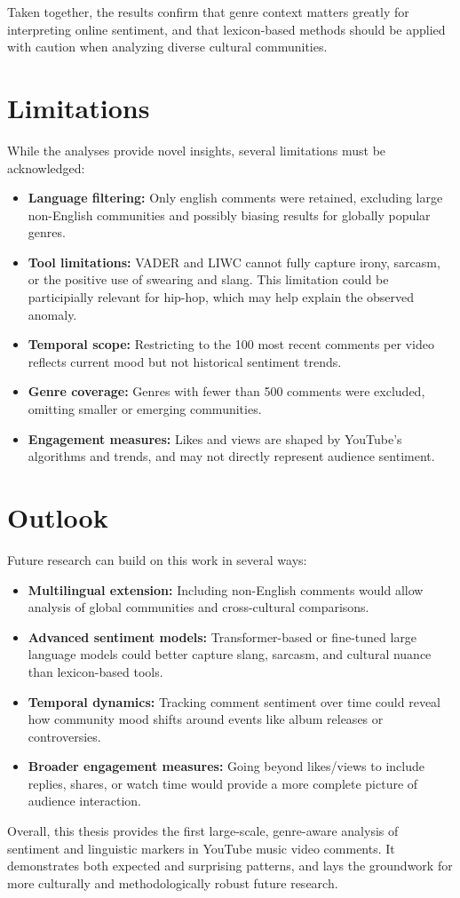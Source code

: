 Taken together, the results confirm that genre context matters greatly for interpreting online sentiment, and that lexicon-based methods should be applied with caution when analyzing diverse cultural communities.  

\section{Limitations}

While the analyses provide novel insights, several limitations must be acknowledged:

\begin{itemize}
    \item \textbf{Language filtering:} Only english comments were retained, excluding large non-English communities and possibly biasing results for globally popular genres.
    \item \textbf{Tool limitations:} VADER and LIWC cannot fully capture irony, sarcasm, or the positive use of swearing and slang. This limitation could be participially relevant for hip-hop, which may help explain the observed anomaly.
    \item \textbf{Temporal scope:} Restricting to the 100 most recent comments per video reflects current mood but not historical sentiment trends.
    \item \textbf{Genre coverage:} Genres with fewer than 500 comments were excluded, omitting smaller or emerging communities.
    \item \textbf{Engagement measures:} Likes and views are shaped by YouTube’s algorithms and trends, and may not directly represent audience sentiment.
\end{itemize}

\section{Outlook}

Future research can build on this work in several ways:

\begin{itemize}
    \item \textbf{Multilingual extension:} Including non-English comments would allow analysis of global communities and cross-cultural comparisons.
    \item \textbf{Advanced sentiment models:} Transformer-based or fine-tuned large language models could better capture slang, sarcasm, and cultural nuance than lexicon-based tools.
    \item \textbf{Temporal dynamics:} Tracking comment sentiment over time could reveal how community mood shifts around events like album releases or controversies.
    \item \textbf{Broader engagement measures:} Going beyond likes/views to include replies, shares, or watch time would provide a more complete picture of audience interaction.
\end{itemize}

Overall, this thesis provides the first large-scale, genre-aware analysis of sentiment and linguistic markers in YouTube music video comments.  
It demonstrates both expected and surprising patterns, and lays the groundwork for more culturally and methodologically robust future research.
